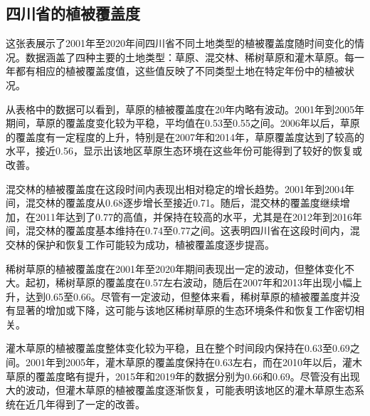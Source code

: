 \documentclass[AutoFakeBold]{LZUThesis-PgD&PhD}
\begin{document}
    \subsection{四川省的植被覆盖度}

    \par 这张表展示了2001年至2020年间四川省不同土地类型的植被覆盖度随时间变化的情况。数据涵盖了四种主要的土地类型：草原、混交林、稀树草原和灌木草原。每一年都有相应的植被覆盖度值，这些值反映了不同类型土地在特定年份中的植被状况。
    
    从表格中的数据可以看到，草原的植被覆盖度在20年内略有波动。2001年到2005年期间，草原的覆盖度变化较为平稳，平均值在0.53至0.55之间。2006年以后，草原的覆盖度有一定程度的上升，特别是在2007年和2014年，草原覆盖度达到了较高的水平，接近0.56，显示出该地区草原生态环境在这些年份可能得到了较好的恢复或改善。
    
    混交林的植被覆盖度在这段时间内表现出相对稳定的增长趋势。2001年到2004年间，混交林的覆盖度从0.68逐步增长至接近0.71。随后，混交林的覆盖度继续增加，在2011年达到了0.77的高值，并保持在较高的水平，尤其是在2012年到2016年间，混交林的覆盖度基本维持在0.74至0.77之间。这表明四川省在这段时间内，混交林的保护和恢复工作可能较为成功，植被覆盖度逐步提高。
    
    稀树草原的植被覆盖度在2001年至2020年期间表现出一定的波动，但整体变化不大。起初，稀树草原的覆盖度在0.57左右波动，随后在2007年和2013年出现小幅上升，达到0.65至0.66。尽管有一定波动，但整体来看，稀树草原的植被覆盖度并没有显著的增加或下降，这可能与该地区稀树草原的生态环境条件和恢复工作密切相关。
    
    灌木草原的植被覆盖度整体变化较为平稳，且在整个时间段内保持在0.63至0.69之间。2001年到2005年，灌木草原的覆盖度保持在0.63左右，而在2010年以后，灌木草原的覆盖度略有提升，2015年和2019年的数据分别为0.66和0.69。尽管没有出现大的波动，但灌木草原的植被覆盖度逐渐恢复，可能表明该地区的灌木草原生态系统在近几年得到了一定的改善。
    
\end{document}

